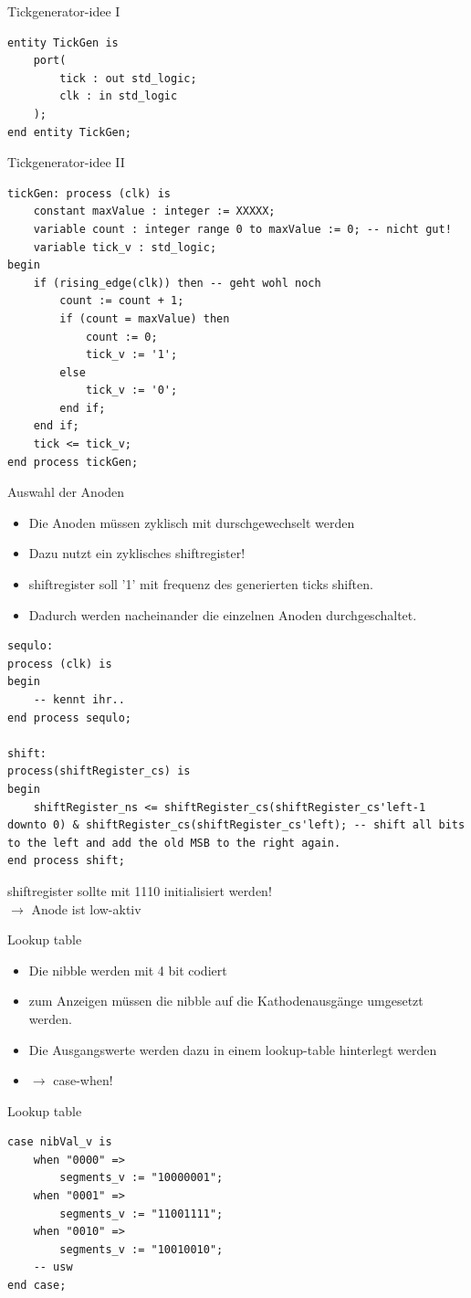 \documentclass[aspectratio=169,presentation]{beamer}
\begin{document}
\begin{frame} [fragile] {Tickgenerator-idee I}
	\begin{lstlisting}
entity TickGen is
    port(
        tick : out std_logic;
        clk : in std_logic
    );
end entity TickGen;
	\end{lstlisting}
\end{frame}


\begin{frame} [fragile] {Tickgenerator-idee II}
	\begin{lstlisting}
tickGen: process (clk) is
	constant maxValue : integer := XXXXX;
	variable count : integer range 0 to maxValue := 0; -- nicht gut!
	variable tick_v : std_logic;
begin
	if (rising_edge(clk)) then -- geht wohl noch
		count := count + 1;
		if (count = maxValue) then
			count := 0;
			tick_v := '1';
		else
			tick_v := '0';
		end if;
	end if;
	tick <= tick_v;
end process tickGen;
	\end{lstlisting}
\end{frame}


\begin{frame} {Auswahl der Anoden}
	\begin{itemize}
		\item Die Anoden müssen zyklisch mit durschgewechselt werden
		\item Dazu nutzt ein zyklisches shiftregister!
		\item shiftregister soll '1' mit frequenz des generierten ticks shiften.
		\item Dadurch werden nacheinander die einzelnen Anoden durchgeschaltet.
	\end{itemize}
\end{frame}


\begin{frame} [fragile]
	\begin{lstlisting}
sequlo:
process (clk) is
begin
	-- kennt ihr..
end process sequlo;

shift:
process(shiftRegister_cs) is 
begin
	shiftRegister_ns <= shiftRegister_cs(shiftRegister_cs'left-1 downto 0) & shiftRegister_cs(shiftRegister_cs'left); -- shift all bits to the left and add the old MSB to the right again.
end process shift;
	\end{lstlisting}
	shiftregister sollte mit \grqq{}1110\grqq{} initialisiert werden!\\
	$\rightarrow$ Anode ist low-aktiv
\end{frame}


\begin{frame} {Lookup table}
	\begin{itemize}
		\item Die nibble werden mit 4 bit codiert
		\item zum Anzeigen müssen die nibble auf die Kathodenausgänge umgesetzt werden.
		\item Die Ausgangswerte werden dazu in einem lookup-table hinterlegt werden
		\item $\rightarrow$ case-when!
	\end{itemize}
\end{frame}

\begin{frame} [fragile] {Lookup table}
	\begin{lstlisting}
case nibVal_v is
	when "0000" => 
		segments_v := "10000001";
	when "0001" => 
		segments_v := "11001111";
	when "0010" => 
		segments_v := "10010010";    
	-- usw
end case;
	\end{lstlisting}
\end{frame}
\end{document}
